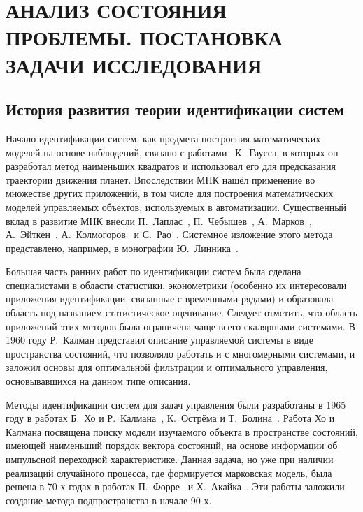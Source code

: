 \chapter[Анализ состояния проблемы. Постановка задачи исследования]{%
  АНАЛИЗ СОСТОЯНИЯ ПРОБЛЕМЫ. \hspace{2cm}
  ПОСТАНОВКА ЗАДАЧИ ИССЛЕДОВАНИЯ
}

\section{История развития теории идентификации систем}

Начало идентификации систем, как предмета построения математических моделей на основе наблюдений,
связано с работами~\cite{gauss_1809, gauss_1810, gauss_1821} К.~Гаусса,
в которых он разработал метод наименьших квадратов и использовал его для предсказания
траектории движения планет.
Впоследствии МНК нашёл применение во множестве других приложений,
в том числе для построения математических моделей управляемых объектов,
используемых в автоматизации.
Существенный вклад в развитие МНК внесли
П.~Лаплас~\cite{laplace_1812},
П.~Чебышев~\cite{chebyshev_1859},
А.~Марков~\cite{markov_1898},
А.~Эйткен~\cite{aitken_1935},
А.~Колмогоров~\cite{kolmogorov_1946} и
С.~Рао~\cite{rao_1946}.
Системное изложение этого метода представлено, например, в монографии Ю.~Линника~\cite{linnik62}.

Большая часть ранних работ по идентификации систем была сделана специалистами в области статистики,
эконометрики (особенно их интересовали приложения идентификации, связанные с временными рядами) и
образовала область под названием статистическое оценивание.
Следует отметить, что область приложений этих методов была ограничена чаще всего скалярными системами.
В 1960 году Р.~Калман представил описание управляемой системы в виде пространства состояний,
что позволяло работать и с многомерными системами,
и заложил основы для оптимальной фильтрации и оптимального управления,
основывавшихся на данном типе описания.

Методы идентификации систем для задач управления были разработаны в 1965 году в работах
Б.~Хо и Р.~Калмана~\cite{ho_1965}, К.~Острёма и Т.~Болина~\cite{astrom_1965}.
Работа Хо и Калмана посвящена поиску модели изучаемого объекта в пространстве состояний,
имеющей наименьший порядок вектора состояний,
на основе информации об импульсной переходной характеристике.
Данная задача, но уже при наличии реализаций случайного процесса, где формируется марковская модель,
была решена в 70-х годах в работах П.~Форре~\cite{faurre_1973} и Х.~Акайка~\cite{akaike_1974}.
Эти работы заложили создание метода подпространства в начале 90-х.

